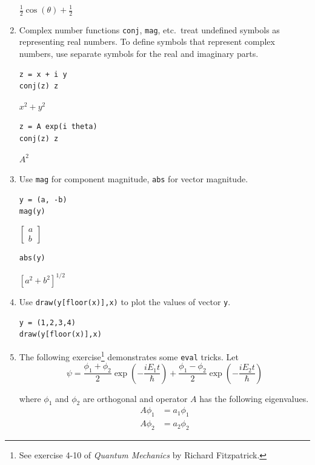 \documentclass[12pt]{article}
\begin{document}
\begin{enumerate}
$\frac{1}{2}\cos(\theta)+\frac{1}{2}$

\item
Complex number functions \verb$conj$, \verb$mag$, etc.~treat undefined symbols as
representing real numbers.
To define symbols that represent complex numbers, use separate symbols for the
real and imaginary parts.

{\color{blue}
\begin{verbatim}
z = x + i y
conj(z) z
\end{verbatim}}

$x^2+y^2$

{\color{blue}
\begin{verbatim}
z = A exp(i theta)
conj(z) z
\end{verbatim}}

$A^2$

\item
Use \verb$mag$ for component magnitude, \verb$abs$ for vector magnitude.

{\color{blue}
\begin{verbatim}
y = (a, -b)
mag(y)
\end{verbatim}}

$\begin{bmatrix}a\\b\end{bmatrix}$

{\color{blue}
\begin{verbatim}
abs(y)
\end{verbatim}}

$\left[a^2+b^2\right]^{1/2}$

\item
Use \verb$draw(y[floor(x)],x)$ to plot the values of vector \verb$y$.

{\color{blue}
\begin{verbatim}
y = (1,2,3,4)
draw(y[floor(x)],x)
\end{verbatim}}

\newpage

\item
The following exercise\footnote{See exercise 4-10 of {\it Quantum Mechanics} by Richard Fitzpatrick.}
demonstrates some \verb$eval$ tricks.
Let
\begin{equation*}
\psi
=\frac{\phi_1+\phi_2}{2}\exp\left(-\frac{iE_1t}{\hbar}\right)
+\frac{\phi_1-\phi_2}{2}\exp\left(-\frac{iE_2t}{\hbar}\right)
\end{equation*}

where $\phi_1$ and $\phi_2$ are orthogonal and operator $A$ has the following eigenvalues.
\begin{align*}
A\phi_1&=a_1\phi_1
\\
A\phi_2&=a_2\phi_2
\end{align*}


\end{enumerate}
\end{document}
